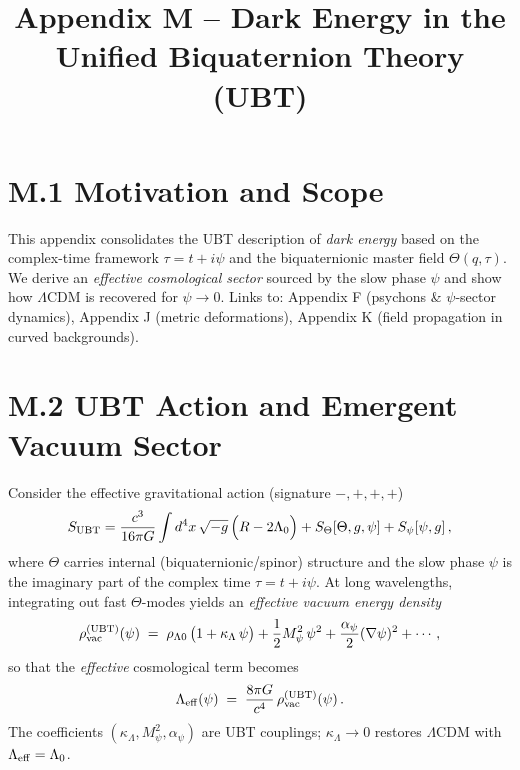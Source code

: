 \documentclass[12pt]{article}
\title{Appendix M -- Dark Energy in the Unified Biquaternion Theory (UBT)}
\date{}
\begin{document}
\maketitle

\section*{M.1 Motivation and Scope}
This appendix consolidates the UBT description of \emph{dark energy} based on the complex-time framework $\tau=t+i\psi$ and the biquaternionic master field $\Theta(q,\tau)$.
We derive an \emph{effective cosmological sector} sourced by the slow phase $\psi$ and show how $\Lambda$CDM is recovered for $\psi\to 0$.
Links to: Appendix F (psychons \& $\psi$-sector dynamics), Appendix J (metric deformations), Appendix K (field propagation in curved backgrounds).

\section*{M.2 UBT Action and Emergent Vacuum Sector}
Consider the effective gravitational action (signature $-,+,+,+$)
\begin{equation}
S_{\rm UBT}=\frac{c^3}{16\pi G}\int d^4x\,\sqrt{-g}\,\Big(R-2\Lambda_0\Big)+
S_\Theta[\Theta,g,\psi]+S_\psi[\psi,g]\,,
\end{equation}
where $\Theta$ carries internal (biquaternionic/spinor) structure and the slow phase $\psi$ is the imaginary part of the complex time $\tau=t+i\psi$.
At long wavelengths, integrating out fast $\Theta$-modes yields an \emph{effective vacuum energy density}
\begin{equation}
\rho_{\rm vac}^{\rm (UBT)}(\psi)\;=\;\rho_{\Lambda 0}\,\big(1+\kappa_\Lambda\,\psi\big)+\frac{1}{2}M_\psi^2\,\psi^2+\frac{\alpha_\psi}{2}(\nabla\psi)^2+\cdots,
\label{eq:rho_vac}
\end{equation}
so that the \emph{effective} cosmological term becomes
\begin{equation}
\Lambda_{\rm eff}(\psi)\;=\;\frac{8\pi G}{c^4}\,\rho_{\rm vac}^{\rm (UBT)}(\psi)\,.
\end{equation}
The coefficients $(\kappa_\Lambda,M_\psi^2,\alpha_\psi)$ are UBT couplings; $\kappa_\Lambda\!\to\!0$ restores $\Lambda$CDM with $\Lambda_{\rm eff}=\Lambda_0$.
\end{document}
